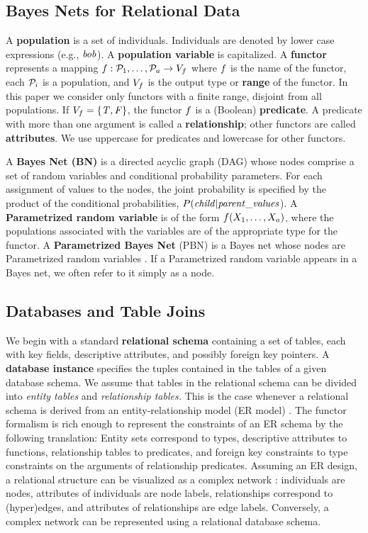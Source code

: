 \documentclass{article}
\begin{document}
\subsection{Bayes Nets for Relational Data}
A \textbf{population} is a set of individuals. Individuals are denoted by lower case expressions (e.g., $\it{bob}$). A \textbf{population variable} is capitalized. A \textbf{functor} represents a mapping
$
f: \mathcal{P}_{1},\ldots,\mathcal{P}_{a} \rightarrow V_{f}
$
where $f$ is the name of the functor, each $\mathcal{P}_{i}$ is a population, and $V_{f}$ is the output type or \textbf{range} of the functor. In this paper we consider only functors with a finite range, disjoint from all populations.  If $V_{f} = \{\mathit{T},\mathit{F}\}$, the functor $f$ is a (Boolean) \textbf{predicate}. A predicate with more than one argument is called a \textbf{relationship}; other functors are called \textbf{attributes}. We use uppercase for predicates and lowercase for other functors.

A {\bf Bayes Net (BN)} is a directed acyclic graph (DAG) whose nodes comprise a set of random variables and conditional probability parameters.
For each assignment of values to the nodes, the joint probability 
is specified by the product of the conditional probabilities, $P(\it{child}|\it{parent\_values}$).
A \textbf{Parametrized random variable} is of the form $f(X_{1},\ldots,X_{a})$, where the populations associated with the variables are of the appropriate type for the functor. A \textbf{Parametrized Bayes Net} (PBN) is a Bayes net whose nodes are Parametrized random variables \cite{Poole2003}. If a Parametrized random variable appears in a Bayes net, we often refer to it simply as a node. 

\subsection{Databases and Table Joins}
 
 We begin with a standard \textbf{relational schema} containing a set of tables, each with key fields, %
descriptive attributes, and possibly foreign key pointers. A \textbf{database instance} specifies the tuples contained in the tables of a given database schema. We assume that tables in the relational schema can be divided into {\em entity tables} and {\em relationship tables.} This is the case whenever a relational schema is derived from an entity-relationship model (ER model) \cite[Ch.2.2]{Ullman1982}. The functor formalism is rich enough to represent the constraints of an ER schema by the following translation: Entity sets correspond to types, descriptive attributes to functions, relationship tables to predicates, and foreign key constraints to type constraints on the arguments of relationship predicates.  Assuming an ER design, a relational structure can be visualized as a complex network \cite[Ch.8.2.1]{Russell2010}: individuals are nodes, attributes of individuals are node labels, relationships correspond to (hyper)edges, and attributes of relationships are edge labels. Conversely, a complex  network can be represented using a relational database schema.
\end{document}
